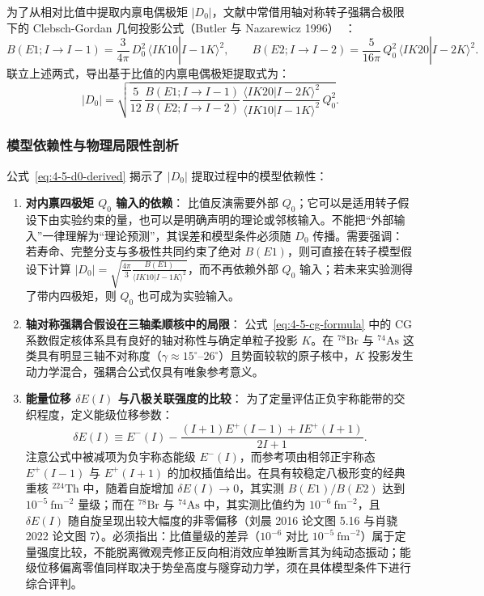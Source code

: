 为了从相对比值中提取内禀电偶极矩 $|D_0|$，文献中常借用轴对称转子强耦合极限下的 Clebsch-Gordan 几何投影公式（Butler 与 Nazarewicz 1996）~\cite{butler-1996-octupole-shapes}：
\begin{equation}\label{eq:4-5-cg-formula}
B(E1; I \to I-1) = \frac{3}{4\pi}\,D_0^2\,\langle I K 1 0 | I-1 K \rangle^2 , \qquad
B(E2; I \to I-2) = \frac{5}{16\pi}\,Q_0^2\,\langle I K 2 0 | I-2 K \rangle^2 .
\end{equation}
联立上述两式，导出基于比值的内禀电偶极矩提取式为：
\begin{equation}\label{eq:4-5-d0-derived}
|D_0| = \sqrt{\frac{5}{12}\,\frac{B(E1; I \to I-1)}{B(E2; I \to I-2)}\,\frac{\langle I K 2 0 | I-2 K \rangle^2}{\langle I K 1 0 | I-1 K \rangle^2}\,Q_0^2} .
\end{equation}

\subsubsection{模型依赖性与物理局限性剖析}

公式~\eqref{eq:4-5-d0-derived} 揭示了 $|D_0|$ 提取过程中的模型依赖性：
\begin{enumerate}
\item \textbf{对内禀四极矩 $Q_0$ 输入的依赖}：
比值反演需要外部 $Q_0$；它可以是适用转子假设下由实验约束的量，也可以是明确声明的理论或邻核输入。不能把“外部输入”一律理解为“理论预测”，其误差和模型条件必须随 $D_0$ 传播。需要强调：若寿命、完整分支与多极性共同约束了绝对 $B(E1)$，则可直接在转子模型假设下计算 $|D_0| = \sqrt{\frac{4\pi}{3} \frac{B(E1)}{\langle I K 1 0 | I-1 K \rangle^2}}$，而不再依赖外部 $Q_0$ 输入；若未来实验测得了带内四极矩，则 $Q_0$ 也可成为实验输入。
\item \textbf{轴对称强耦合假设在三轴柔顺核中的局限}：
公式~\eqref{eq:4-5-cg-formula} 中的 CG 系数假定核体系具有良好的轴对称性与确定单粒子投影 $K$。在 $^{78}\mathrm{Br}$ 与 $^{74}\mathrm{As}$ 这类具有明显三轴不对称度（$\gamma \approx 15^\circ$--$26^\circ$）且势面较软的原子核中，$K$ 投影发生动力学混合，强耦合公式仅具有唯象参考意义。
\item \textbf{能量位移 $\delta E(I)$ 与八极关联强度的比较}：
为了定量评估正负宇称能带的交织程度，定义能级位移参数：
\begin{equation}\label{eq:4-5-delta-e-def}
\delta E(I) \equiv E^-(I) - \frac{(I+1) E^+(I-1) + I E^+(I+1)}{2I + 1}.
\end{equation}
注意公式中被减项为负宇称态能级 $E^-(I)$，而参考项由相邻正宇称态 $E^+(I-1)$ 与 $E^+(I+1)$ 的加权插值给出。在具有较稳定八极形变的经典重核 $^{224}\mathrm{Th}$ 中，随着自旋增加 $\delta E(I) \to 0$，其实测 $B(E1)/B(E2)$ 达到 $10^{-5}\ \mathrm{fm}^{-2}$ 量级；而在 $^{78}\mathrm{Br}$ 与 $^{74}\mathrm{As}$ 中，其实测比值约为 $10^{-6}\ \mathrm{fm}^{-2}$，且 $\delta E(I)$ 随自旋呈现出较大幅度的非零偏移（刘晨 2016 论文图 5.16 与肖骁 2022 论文图 7）。必须指出：比值量级的差异（$10^{-6}$ 对比 $10^{-5}\ \mathrm{fm}^{-2}$）属于定量强度比较，不能脱离微观壳修正反向相消效应单独断言其为纯动态振动；能级位移偏离零值同样取决于势垒高度与隧穿动力学，须在具体模型条件下进行综合评判。
\end{enumerate}


